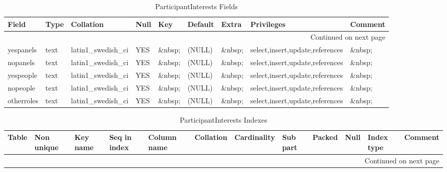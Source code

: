 \documentclass[tablesignature]{scrartcl}
\begin{document}
\begin{longtable}{|l|l|l|l|l|l|l|l|l|}
\caption{ParticipantInterests Fields} \label{tbl:participantinterestsfields}\\
\hline
 Field       &  Type         &  Collation                &  Null     &  Key      &  Default  &  Extra    &  Privileges                       &  Comment \\
\hline
\endhead
\hline\multicolumn{9}{r}{Continued on next page}\
\endfoot
\endlastfoot
\hline
 badgeid     &  varchar(15)  &  latin1\_{}swedish\_{}ci  &  \&nbsp;  &  PRI      &  \&nbsp;  &  \&nbsp;  &  select,insert,update,references  &  \&nbsp;  \\
 yespanels   &  text         &  latin1\_{}swedish\_{}ci  &  YES      &  \&nbsp;  &  (NULL)   &  \&nbsp;  &  select,insert,update,references  &  \&nbsp;  \\
 nopanels    &  text         &  latin1\_{}swedish\_{}ci  &  YES      &  \&nbsp;  &  (NULL)   &  \&nbsp;  &  select,insert,update,references  &  \&nbsp;  \\
 yespeople   &  text         &  latin1\_{}swedish\_{}ci  &  YES      &  \&nbsp;  &  (NULL)   &  \&nbsp;  &  select,insert,update,references  &  \&nbsp;  \\
 nopeople    &  text         &  latin1\_{}swedish\_{}ci  &  YES      &  \&nbsp;  &  (NULL)   &  \&nbsp;  &  select,insert,update,references  &  \&nbsp;  \\
 otherroles  &  text         &  latin1\_{}swedish\_{}ci  &  YES      &  \&nbsp;  &  (NULL)   &  \&nbsp;  &  select,insert,update,references  &  \&nbsp;  \\
\hline
\end{longtable}


\begin{longtable}{|l|l|l|l|l|l|l|l|l|l|l|l|}
\caption{ParticipantInterests Indexes} \label{tbl:participantinterestesindexes}\\
\hline
 Table                 &  Non unique  &  Key name  &  Seq in index  &  Column name  &  Collation  &  Cardinality  &  Sub part  &  Packed  &  Null     &  Index type  &  Comment \\
\hline
\endhead
\hline\multicolumn{12}{r}{Continued on next page}\
\endfoot
\endlastfoot
\hline
 ParticipantInterests  &           0  &  PRIMARY   &             1  &  badgeid      &  A          &            1  &  (NULL)    &  (NULL)  &  \&nbsp;  &  BTREE       &  \&nbsp;  \\
\hline
\end{longtable}
\end{document}
